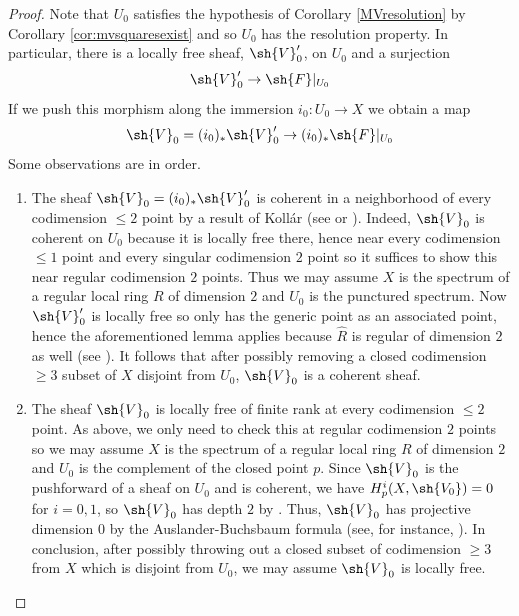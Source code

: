 \documentclass[12pt]{amsart}
\begin{document}
\begin{proof}
Note that $U_0$ satisfies the hypothesis of Corollary \ref{MVresolution} by Corollary \ref{cor:mvsquaresexist} and so $U_0$ has the resolution property. In particular, there is a locally free sheaf, $\sh{V}_0'$, on $U_0$ and a surjection
\[\sh{V}_0' \to \sh{F}|_{U_0}\]
If we push this morphism along the immersion $i_0: U_0 \to X$ we obtain a map
\[\sh{V}_0=(i_0)_*\sh{V}_0' \to (i_0)_*\sh{F}|_{U_0}\]
Some observations are in order.
\begin{enumerate}
\item The sheaf $\sh{V}_0=(i_0)_*\sh{V}_0'$ is coherent in a neighborhood of every codimension $\leq 2$ point by a result of Koll\'ar (see \cite[Tag 0BK3]{stacks} or \cite{MR3694300}). Indeed, $\sh{V}_0$ is coherent on $U_0$ because it is locally free there, hence near every codimension $\leq 1$ point and every singular codimension $2$ point so it suffices to show this near regular codimension $2$ points. Thus we may assume $X$ is the spectrum of a regular local ring $R$ of dimension $2$ and $U_0$ is the punctured spectrum. Now $\sh{V}_0'$ is locally free so only has the generic point as an associated point, hence the aforementioned lemma applies because $\hat{R}$ is regular of dimension $2$ as well (see \cite[Tags 07NV, 07NY]{stacks}). It follows that after possibly removing a closed codimension $\geq 3$ subset of $X$ disjoint from $U_0$, $\sh{V}_0$ is a coherent sheaf.

\item The sheaf $\sh{V}_0$ is locally free of finite rank at every codimension $\leq 2$ point. As above, we only need to check this at regular codimension $2$ points so we may assume $X$ is the spectrum of a regular local ring $R$ of dimension $2$ and $U_0$ is the complement of the closed point $p$. Since $\sh{V}_0$ is the pushforward of a sheaf on $U_0$ and is coherent, we have $H^i_p(X,\sh{V_0})=0$ for $i=0,1$, so $\sh{V}_0$ has depth $2$ by \cite[Thm. 3.8]{MR0224620}. Thus, $\sh{V}_0$ has projective dimension $0$ by the Auslander-Buchsbaum formula (see, for instance, \cite[Tag 090V]{stacks}). In conclusion, after possibly throwing out a closed subset of codimension $\geq 3$ from $X$ which is disjoint from $U_0$, we may assume $\sh{V}_0$ is locally free.


\end{enumerate}
\end{proof}
\end{document}
